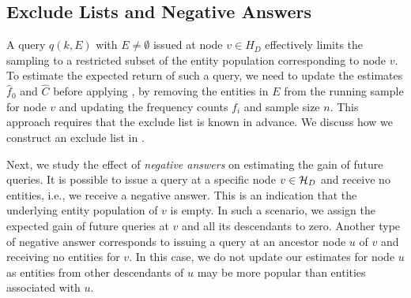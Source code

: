 
\subsection{Exclude Lists and Negative Answers}
\label{sec:excludelist}
A query $q(k, E)$ with $E \ne \emptyset$ issued at node $v \in H_D$ effectively limits the sampling to a restricted subset of the entity population corresponding to node $v$. To estimate the expected return of such a query, we need to update the estimates $\hat{f}_0$ and $\hat{C}$ before applying , by removing the entities in $E$ from the running sample for node $v$ and updating the frequency counts $f_i$ and sample size $n$. This approach requires that the exclude list is known in advance. We discuss how we construct an exclude list in .

Next, we study the effect of {\em negative answers} on estimating the gain of future queries. It is possible to issue a query at a specific node $v \in \mathcal{H}_D$ and receive no entities, i.e., we receive a negative answer. This is an indication that the underlying entity population of $v$ is empty. In such a scenario, we assign the expected gain of future queries at $v$ and all its descendants to zero. Another type of negative answer corresponds to issuing a query at an ancestor node $u$ of $v$ and receiving no entities for $v$. In this case, we do not update our estimates for node $u$ as entities from other descendants of $u$ may be more popular than entities associated with $u$.

